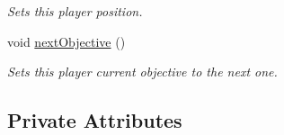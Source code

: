 \begin{DoxyCompactItemize}
\begin{DoxyCompactList}\small\item\em Sets this player position. \end{DoxyCompactList}\item 
\mbox{\label{structlabyrinth_1_1_player_a3bc06f99ef32f8d870f244e0cc3a7e5a}} 
void \mbox{\hyperlink{structlabyrinth_1_1_player_a3bc06f99ef32f8d870f244e0cc3a7e5a}{next\+Objective}} ()
\begin{DoxyCompactList}\small\item\em Sets this player current objective to the next one. \end{DoxyCompactList}\end{DoxyCompactItemize}
\subsection*{Private Attributes}
